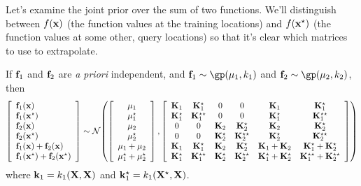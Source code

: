 
Let's examine the joint prior over the sum of two functions.
We'll distinguish between $f({\bf{x}})$ (the function values at the training locations) and  $f({\bf{x}}^\star)$ (the function values at some other, query locations) so that it's clear which matrices to use to extrapolate.

If ${\bf{f}}_1$ and ${\bf{f}}_2$ are \emph{a priori} independent, and $\vf_1 \sim \gp( \vmu_1, k_1)$ and $\vf_2 \sim \gp( \vmu_2, k_2)$, then
%
\begin{align}
\left[ \begin{array}{l} 
{\bf{f}}_1({\bf{x}}) \\
{\bf{f}}_1({\bf{x}}^\star) \\
{\bf{f}}_2({\bf{x}}) \\
{\bf{f}}_2({\bf{x}}^\star) \\
{\bf{f}}_1({\bf{x}}) + {\bf{f}}_2({\bf{x}}) \\
{\bf{f}}_1({\bf{x}}^\star) + {\bf{f}}_2({\bf{x}}^\star)
\end{array} \right]
\sim
\mathcal{N}\!\left(
\left[ \begin{array}{c} {\bf{\mu}}_1 \\ {\bf{\mu}}_1^\star \\ {\bf{\mu}}_2 \\ {\bf{\mu}}_2^\star \\ {\bf{\mu}}_1 + {\bf{\mu}}_2 \\ {\bf{\mu}}_1^\star + {\bf{\mu}}_2^\star \end{array} \right]
,\left[ \begin{array}{cccccc} 
\mathbf{K}_1 & \mathbf{K}_1^\star & 0 & 0 & \mathbf{K}_1 & \mathbf{K}_1^\star \\ 
\mathbf{K}_1^\star & \mathbf{K}_1^{\star\star} & 0 & 0 & \mathbf{K}_1^\star & \mathbf{K}_1^{\star\star} \\
0 & 0 & \mathbf{K}_2 & \mathbf{K}_2^\star & \mathbf{K}_2 & \mathbf{K}_2^\star \\ 
0 & 0 & \mathbf{K}_2^\star & \mathbf{K}_2^{\star\star} & \mathbf{K}_2^\star & \mathbf{K}_2^{\star\star} \\
\mathbf{K}_1 & \mathbf{K}_1^\star & \mathbf{K}_2 & \mathbf{K}_2^\star & \mathbf{K}_1 + \mathbf{K}_2 & \mathbf{K}_1^\star + \mathbf{K}_2^\star \\ 
\mathbf{K}_1^\star & \mathbf{K}_1^{\star\star}  & \mathbf{K}_2^\star & \mathbf{K}_2^{\star\star}  & \mathbf{K}_1^\star + \mathbf{K}_2^\star & \mathbf{K}_1^{\star\star} + \mathbf{K}_2^{\star\star}\\
\end{array} \right]
\right)
\end{align}
%
where ${\bf{k}}_1 = k_1( \mathbf{X}, \mathbf{X} )$ and ${\bf{k}}_1^\star = k_1( \mathbf{X}^\star, \mathbf{X} )$. 

